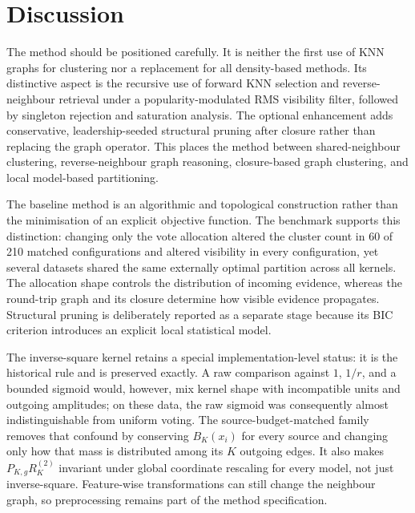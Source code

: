 \documentclass[pdflatex,sn-mathphys-num]{sn-jnl}
\begin{document}
\section{Discussion}\label{sec:discussion}

The method should be positioned carefully. It is neither the first use of KNN graphs for clustering nor a replacement for all density-based methods. Its distinctive aspect is the recursive use of forward KNN selection and reverse-neighbour retrieval under a popularity-modulated RMS visibility filter, followed by singleton rejection and saturation analysis. The optional enhancement adds conservative, leadership-seeded structural pruning after closure rather than replacing the graph operator. This places the method between shared-neighbour clustering, reverse-neighbour graph reasoning, closure-based graph clustering, and local model-based partitioning.

The baseline method is an algorithmic and topological construction rather than the minimisation of an explicit objective function. The benchmark supports this distinction: changing only the vote allocation altered the cluster count in 60 of 210 matched configurations and altered visibility in every configuration, yet several datasets shared the same externally optimal partition across all kernels. The allocation shape controls the distribution of incoming evidence, whereas the round-trip graph and its closure determine how visible evidence propagates. Structural pruning is deliberately reported as a separate stage because its BIC criterion introduces an explicit local statistical model.

The inverse-square kernel retains a special implementation-level status: it is
the historical rule and is preserved exactly.  A raw comparison against $1$,
$1/r$, and a bounded sigmoid would, however, mix kernel shape with incompatible
units and outgoing amplitudes; on these data, the raw sigmoid was consequently
almost indistinguishable from uniform voting.  The source-budget-matched family
removes that confound by conserving $B_K(x_i)$ for every source and changing
only how that mass is distributed among its $K$ outgoing edges.  It also makes
$P_{K,g}R_K^{(2)}$ invariant under global coordinate rescaling for every model,
not just inverse-square.  Feature-wise transformations can still change the
neighbour graph, so preprocessing remains part of the method specification.
\end{document}
